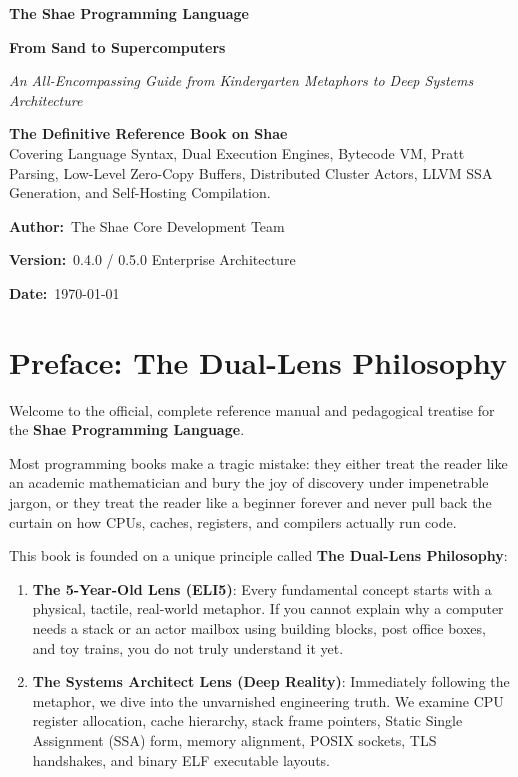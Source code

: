 \documentclass[11pt,a4paper,oneside]{book}
\begin{document}
\begin{titlepage}
\centering
\vspace*{1.5cm}
{\Huge\bfseries\color{shaeNavy} The Shae Programming Language \par}
\vspace{0.6cm}
{\Large\bfseries\color{shaeTeal} From Sand to Supercomputers \par}
\vspace{0.4cm}
{\large\itshape An All-Encompassing Guide from Kindergarten Metaphors to Deep Systems Architecture \par}
\vspace{1.5cm}
\begin{tcolorbox}[colback=shaeNavy!5!white,colframe=shaeNavy,arc=3mm,width=0.88\textwidth,center]
\centering
\vspace{4pt}
\textbf{The Definitive Reference Book on Shae}\\
\small Covering Language Syntax, Dual Execution Engines, Bytecode VM, Pratt Parsing, Low-Level Zero-Copy Buffers, Distributed Cluster Actors, LLVM SSA Generation, and Self-Hosting Compilation.
\vspace{4pt}
\end{tcolorbox}
\vfill
{\textbf{Author:}\ The Shae Core Development Team \par}
{\textbf{Version:}\ 0.4.0 / 0.5.0 Enterprise Architecture \par}
{\textbf{Date:}\ \today \par}
\vspace*{1cm}
\end{titlepage}

\frontmatter
\chapter*{Preface: The Dual-Lens Philosophy}
Welcome to the official, complete reference manual and pedagogical treatise for the \textbf{Shae Programming Language}.

Most programming books make a tragic mistake: they either treat the reader like an academic mathematician and bury the joy of discovery under impenetrable jargon, or they treat the reader like a beginner forever and never pull back the curtain on how CPUs, caches, registers, and compilers actually run code.

This book is founded on a unique principle called \textbf{The Dual-Lens Philosophy}:
\begin{enumerate}
    \item \textbf{The 5-Year-Old Lens (ELI5)}: Every fundamental concept starts with a physical, tactile, real-world metaphor. If you cannot explain why a computer needs a stack or an actor mailbox using building blocks, post office boxes, and toy trains, you do not truly understand it yet.
    \item \textbf{The Systems Architect Lens (Deep Reality)}: Immediately following the metaphor, we dive into the unvarnished engineering truth. We examine CPU register allocation, cache hierarchy, stack frame pointers, Static Single Assignment (SSA) form, memory alignment, POSIX sockets, TLS handshakes, and binary ELF executable layouts.
\end{enumerate}
\end{document}
